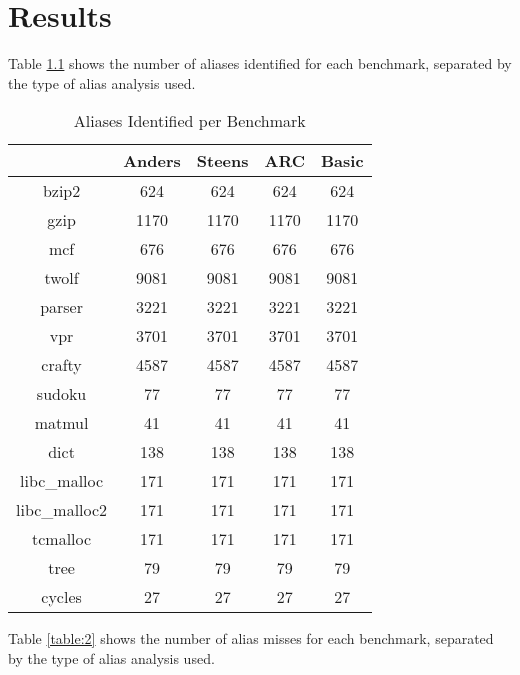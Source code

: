 \chapter{Results}

Table \ref{table:1} shows the number of aliases identified for each benchmark, separated by the type of alias analysis used.

\begin{table} [h!]
\centering
   \begin{tabular} {|c|c c c c|}
      \hline
      & Anders & Steens & ARC & Basic \\
      \hline
	   bzip2 & 624 & 624 & 624 & 624 \\
      \hline
	   gzip & 1170 & 1170 & 1170 & 1170 \\
      \hline
           mcf & 676 & 676 & 676 & 676 \\
      \hline
	   twolf & 9081 & 9081 & 9081 & 9081 \\
      \hline
	   parser & 3221 & 3221 & 3221 & 3221 \\
      \hline
	   vpr & 3701 & 3701 & 3701 & 3701 \\
      \hline
	   crafty & 4587 & 4587 & 4587 & 4587 \\
      \hline
	   sudoku & 77 & 77 & 77 & 77 \\
      \hline
	   matmul & 41 & 41 & 41 & 41 \\
      \hline
	   dict & 138 & 138 & 138 & 138 \\
      \hline
	   libc\_malloc & 171 & 171 & 171 & 171 \\
      \hline
	   libc\_malloc2 & 171 & 171 & 171 & 171 \\
      \hline
	   tcmalloc & 171 & 171 & 171 & 171 \\
      \hline
	   tree & 79 & 79 & 79 & 79 \\
      \hline
	   cycles & 27 & 27 & 27 & 27 \\
      \hline
   \end{tabular}
   \caption{Aliases Identified per Benchmark}
   \label{table:1}
\end{table}

Table \ref{table:2} shows the number of alias misses for each benchmark, separated by the type of alias analysis used.

